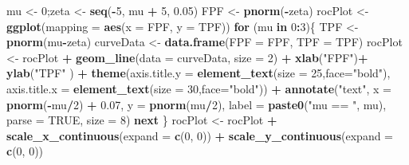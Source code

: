 \documentclass[
]{book}
\newenvironment{Shaded}{\begin{snugshade}}{\end{snugshade}}
\newcommand{\ControlFlowTok}[1]{\textcolor[rgb]{0.13,0.29,0.53}{\textbf{#1}}}
\newcommand{\DataTypeTok}[1]{\textcolor[rgb]{0.13,0.29,0.53}{#1}}
\newcommand{\DecValTok}[1]{\textcolor[rgb]{0.00,0.00,0.81}{#1}}
\newcommand{\FloatTok}[1]{\textcolor[rgb]{0.00,0.00,0.81}{#1}}
\newcommand{\KeywordTok}[1]{\textcolor[rgb]{0.13,0.29,0.53}{\textbf{#1}}}
\newcommand{\NormalTok}[1]{#1}
\newcommand{\OperatorTok}[1]{\textcolor[rgb]{0.81,0.36,0.00}{\textbf{#1}}}
\newcommand{\OtherTok}[1]{\textcolor[rgb]{0.56,0.35,0.01}{#1}}
\newcommand{\StringTok}[1]{\textcolor[rgb]{0.31,0.60,0.02}{#1}}
\begin{document}
\begin{Shaded}
\begin{Highlighting}[]
\NormalTok{mu <-}\StringTok{ }\DecValTok{0}\NormalTok{;zeta <-}\StringTok{ }\KeywordTok{seq}\NormalTok{(}\OperatorTok{-}\DecValTok{5}\NormalTok{, mu }\OperatorTok{+}\StringTok{ }\DecValTok{5}\NormalTok{, }\FloatTok{0.05}\NormalTok{)}
\NormalTok{FPF <-}\StringTok{ }\KeywordTok{pnorm}\NormalTok{(}\OperatorTok{-}\NormalTok{zeta)}
\NormalTok{rocPlot <-}\StringTok{ }\KeywordTok{ggplot}\NormalTok{(}\DataTypeTok{mapping =} \KeywordTok{aes}\NormalTok{(}\DataTypeTok{x =}\NormalTok{ FPF, }\DataTypeTok{y =}\NormalTok{ TPF))}
\ControlFlowTok{for}\NormalTok{ (mu }\ControlFlowTok{in} \DecValTok{0}\OperatorTok{:}\DecValTok{3}\NormalTok{)\{}
\NormalTok{  TPF <-}\StringTok{ }\KeywordTok{pnorm}\NormalTok{(mu}\OperatorTok{-}\NormalTok{zeta)}
\NormalTok{  curveData <-}\StringTok{ }\KeywordTok{data.frame}\NormalTok{(}\DataTypeTok{FPF =}\NormalTok{ FPF, }\DataTypeTok{TPF =}\NormalTok{ TPF)}
\NormalTok{  rocPlot <-}\StringTok{ }\NormalTok{rocPlot }\OperatorTok{+}\StringTok{ }
\StringTok{    }\KeywordTok{geom_line}\NormalTok{(}\DataTypeTok{data =}\NormalTok{ curveData, }\DataTypeTok{size =} \DecValTok{2}\NormalTok{) }\OperatorTok{+}\StringTok{ }
\StringTok{    }\KeywordTok{xlab}\NormalTok{(}\StringTok{"FPF"}\NormalTok{)}\OperatorTok{+}\StringTok{ }\KeywordTok{ylab}\NormalTok{(}\StringTok{"TPF"}\NormalTok{ ) }\OperatorTok{+}\StringTok{ }
\StringTok{    }\KeywordTok{theme}\NormalTok{(}\DataTypeTok{axis.title.y =} \KeywordTok{element_text}\NormalTok{(}\DataTypeTok{size =} \DecValTok{25}\NormalTok{,}\DataTypeTok{face=}\StringTok{"bold"}\NormalTok{),}
          \DataTypeTok{axis.title.x =} \KeywordTok{element_text}\NormalTok{(}\DataTypeTok{size =} \DecValTok{30}\NormalTok{,}\DataTypeTok{face=}\StringTok{"bold"}\NormalTok{))  }\OperatorTok{+}
\StringTok{    }\KeywordTok{annotate}\NormalTok{(}\StringTok{"text"}\NormalTok{, }
             \DataTypeTok{x =} \KeywordTok{pnorm}\NormalTok{(}\OperatorTok{-}\NormalTok{mu}\OperatorTok{/}\DecValTok{2}\NormalTok{) }\OperatorTok{+}\StringTok{ }\FloatTok{0.07}\NormalTok{, }
             \DataTypeTok{y =} \KeywordTok{pnorm}\NormalTok{(mu}\OperatorTok{/}\DecValTok{2}\NormalTok{), }
             \DataTypeTok{label =} \KeywordTok{paste0}\NormalTok{(}\StringTok{"mu == "}\NormalTok{, mu), }
             \DataTypeTok{parse =} \OtherTok{TRUE}\NormalTok{, }\DataTypeTok{size =} \DecValTok{8}\NormalTok{)}
  \ControlFlowTok{next}
\NormalTok{\}}
\NormalTok{rocPlot <-}\StringTok{ }\NormalTok{rocPlot }\OperatorTok{+}
\StringTok{  }\KeywordTok{scale_x_continuous}\NormalTok{(}\DataTypeTok{expand =} \KeywordTok{c}\NormalTok{(}\DecValTok{0}\NormalTok{, }\DecValTok{0}\NormalTok{)) }\OperatorTok{+}\StringTok{ }
\StringTok{  }\KeywordTok{scale_y_continuous}\NormalTok{(}\DataTypeTok{expand =} \KeywordTok{c}\NormalTok{(}\DecValTok{0}\NormalTok{, }\DecValTok{0}\NormalTok{))     }


\end{Highlighting}
\end{Shaded}
\end{document}
